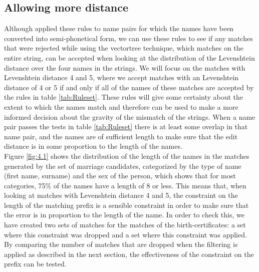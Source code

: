 \subsection{Allowing more distance}
Although \cite{bloothooft2014learning} applied these rules to name pairs for which the names have been converted into semi-phonetical form, we can use these rules to see if any matches that were rejected while using the vectortree technique, which matches on the entire string, can be accepted when looking at the distribution of the Levenshtein distance over the four names in the strings. 
We will focus on the matches with Levenshtein distance 4 and 5, where we accept matches with an Levenshtein distance of 4 or 5 if and only if all of the names of these matches are accepted by the rules in table \ref{tab:Ruleset}. These rules will give some certainty about the extent to which the names match and therefore can be used to make a more informed decision about the gravity of the mismatch of the strings. When a name pair passes the tests in table \ref{tab:Ruleset} there is at least some overlap in that name pair, and the names are of sufficient length to make sure that the edit distance is in some proportion to the length of the names.\\

Figure \ref{fig:4.1} shows the distribution of the length of the names in the matches generated by the set of marriage candidates, categorized by the type of name (first name, surname) and the sex of the person, which shows that for most categories, 75\% of the names have a length of 8 or less. This means that, when looking at matches with Levenshtein distance 4 and 5, the constraint on the length of the matching prefix is a sensible constraint in order to make sure that the error is in proportion to the length of the name. In order to check this, we have created two sets of matches for the matches of the birth-certificates: a set where this constraint was dropped and a set where this constraint was applied. By comparing the number of matches that are dropped when the filtering is applied as described in the next section, the effectiveness of the constraint on the prefix can be tested.

